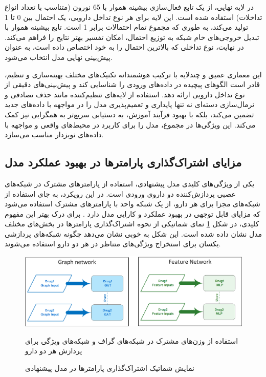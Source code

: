 در لایه نهایی، از یک تابع فعال‌سازی بیشینه هموار با 65 نورون (متناسب با تعداد انواع تداخلات) استفاده شده است. این لایه برای هر نوع تداخل دارویی، یک احتمال بین 0 تا 1 تولید می‌کند، به طوری که مجموع تمام احتمالات برابر 1 است. تابع بیشینه هموار با تبدیل خروجی‌های خام شبکه به توزیع احتمال، امکان تفسیر بهتر نتایج را فراهم می‌کند. در نهایت، نوع تداخلی که بالاترین احتمال را به خود اختصاص داده است، به عنوان پیش‌بینی نهایی مدل انتخاب می‌شود.

این معماری عمیق و چندلایه با ترکیب هوشمندانه تکنیک‌های مختلف بهینه‌سازی و تنظیم، قادر است الگوهای پیچیده در داده‌های ورودی را شناسایی کند و پیش‌بینی‌های دقیقی از نوع تداخل دارویی ارائه دهد. استفاده از لایه‌های تنظیم‌کننده مانند حذف تصادفی و نرمال‌سازی دسته‌ای نه تنها پایداری و تعمیم‌پذیری مدل را در مواجهه با داده‌های جدید تضمین می‌کند، بلکه با بهبود فرآیند آموزش، به دستیابی سریع‌تر به همگرایی نیز کمک می‌کند. این ویژگی‌ها در مجموع، مدل را برای کاربرد در محیط‌های واقعی و مواجهه با داده‌های نویزدار مناسب می‌سازد.

\subsection{مزایای اشتراک‌گذاری پارامترها در بهبود عملکرد مدل}

یکی از ویژگی‌های کلیدی مدل پیشنهادی، استفاده از پارامترهای مشترک در شبکه‌های عصبی پردازش‌کننده دو داروی ورودی است. در این رویکرد، به جای استفاده از شبکه‌های مجزا برای هر دارو، از یک شبکه واحد با پارامترهای مشترک استفاده می‌شود که مزایای قابل توجهی در بهبود عملکرد و کارایی مدل دارد \cite{ref_dai2020}. برای درک بهتر این مفهوم کلیدی، در شکل \ref{fig:param_sharing} نمای شماتیکی از نحوه اشتراک‌گذاری پارامترها در بخش‌های مختلف مدل نشان داده شده است. این شکل به خوبی نشان می‌دهد چگونه شبکه‌های پردازشی یکسان برای استخراج ویژگی‌های متناظر در هر دو دارو استفاده می‌شوند.

\begin{figure}[t]
	\centering
	\includegraphics[width=\textwidth]{images/param-sharing.png}
	\caption{نمایش شماتیک اشتراک‌گذاری پارامترها در مدل پیشنهادی} استفاده از وزن‌های مشترک در شبکه‌های گراف و شبکه‌های ویژگی برای پردازش هر دو دارو
	\label{fig:param_sharing}
\end{figure}

